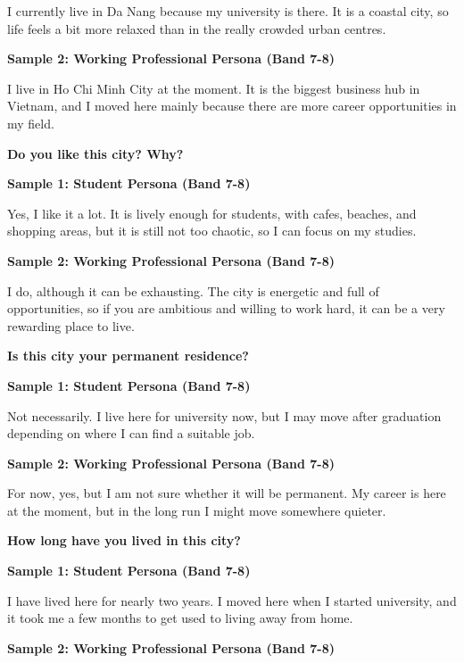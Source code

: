 I currently live in Da Nang because my university is there. It is a coastal city, so life feels a bit more relaxed than in the really crowded urban centres.

\textbf{Sample 2: Working Professional Persona (Band 7-8)}

I live in Ho Chi Minh City at the moment. It is the biggest business hub in Vietnam, and I moved here mainly because there are more career opportunities in my field.

\separator

\begin{ieltsquestion}
\textbf{Do you like this city? Why?}
\end{ieltsquestion}
\textbf{Sample 1: Student Persona (Band 7-8)}

Yes, I like it a lot. It is lively enough for students, with cafes, beaches, and shopping areas, but it is still not too chaotic, so I can focus on my studies.

\textbf{Sample 2: Working Professional Persona (Band 7-8)}

I do, although it can be exhausting. The city is energetic and full of opportunities, so if you are ambitious and willing to work hard, it can be a very rewarding place to live.

\separator

\begin{ieltsquestion}
\textbf{Is this city your permanent residence?}
\end{ieltsquestion}
\textbf{Sample 1: Student Persona (Band 7-8)}

Not necessarily. I live here for university now, but I may move after graduation depending on where I can find a suitable job.

\textbf{Sample 2: Working Professional Persona (Band 7-8)}

For now, yes, but I am not sure whether it will be permanent. My career is here at the moment, but in the long run I might move somewhere quieter.

\separator

\begin{ieltsquestion}
\textbf{How long have you lived in this city?}
\end{ieltsquestion}
\textbf{Sample 1: Student Persona (Band 7-8)}

I have lived here for nearly two years. I moved here when I started university, and it took me a few months to get used to living away from home.

\textbf{Sample 2: Working Professional Persona (Band 7-8)}

